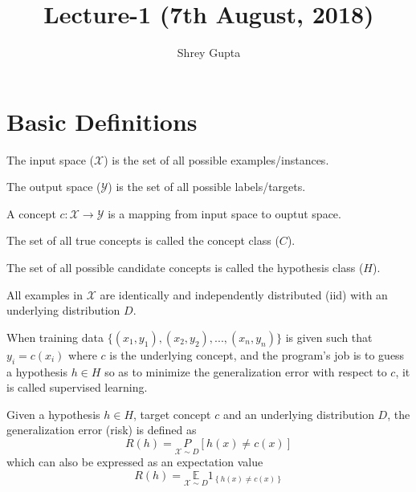 \documentclass[a4paper,english,12pt]{article}
\title{Lecture-1 (7th August, 2018)}
\author{Shrey Gupta}
\begin{document}
\maketitle

\section{Basic Definitions}

\begin{defn}
The input space ($\mathcal{X}$) is the set of all possible examples/instances.
\end{defn}

\begin{defn}
The output space ($\mathcal{Y}$) is the set of all possible labels/targets.
\end{defn}

\begin{defn}
A concept $c:\mathcal{X} \rightarrow \mathcal{Y}$ is a mapping from input space to ouptut space.
\end{defn}

\begin{defn}
The set of all true concepts is called the concept class ($C$).
\end{defn}

\begin{defn}
The set of all possible candidate concepts is called the hypothesis class ($H$).
\end{defn}

\begin{assum}
All examples in $\mathcal{X}$ are identically and independently distributed (iid) with an underlying distribution $D$.
\end{assum}

\begin{defn}
When training data $\{ (x_1, y_1), (x_2, y_2), ... , (x_n, y_n) \}$ is given such that $y_i = c(x_i)$ where $c$ is the underlying concept, and the program's job is to guess a hypothesis $h \in H$ so as to minimize the generalization error with respect to $c$, it is called supervised learning.
\end{defn}

\begin{defn}
Given a hypothesis $h\in H$, target concept $c$ and an underlying distribution $D$, the generalization error (risk) is defined as
$$ R(h) = \underset{\mathcal{X} \sim D} P \left[ h(x) \neq c(x) \right] $$
which can also be expressed as an expectation value
$$ R(h) = \underset{\mathcal{X} \sim D}{\mathbb{E}} 1_{ \left\{ h(x) \neq c(x) \right\}} $$
\end{defn}
\end{document}
